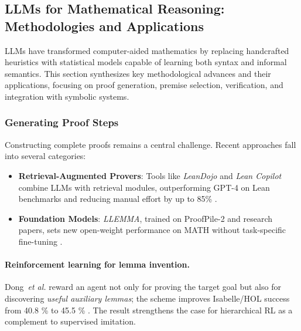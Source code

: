 \documentclass[acmsmall,anonymous]{acmart}
\begin{document}
\subsection{LLMs for Mathematical Reasoning: Methodologies and Applications}
LLMs have transformed computer-aided mathematics by replacing handcrafted heuristics with statistical models capable of learning both syntax and informal semantics. This section synthesizes key methodological advances and their applications, focusing on proof generation, premise selection, verification, and integration with symbolic systems. 

\subsubsection{Generating Proof Steps}\label{sec:proof-steps}
Constructing complete proofs remains a central challenge. Recent approaches fall into several categories:   
\begin{itemize}
    \item \textbf{Retrieval-Augmented Provers}: Tools like \emph{LeanDojo} and \emph{Lean Copilot} combine LLMs with retrieval modules, outperforming GPT-4 on Lean benchmarks and reducing manual effort by up to 85\% \cite{yang-2023-leandojo, huang2024leancopilot}.
    \item \textbf{Foundation Models}: \emph{LLEMMA}, trained on ProofPile-2 and research papers, sets new open-weight performance on MATH without task-specific fine-tuning \cite{azerbayev2024llemma}.
\end{itemize}

\paragraph{Reinforcement learning for lemma invention.}
Dong~\emph{et al.} reward an agent not only for proving the target
goal but also for discovering \emph{useful auxiliary lemmas}; the scheme
improves Isabelle/HOL success from 40.8 \% to 45.5 \%
\cite{dong2024lemmaRL}. The result strengthens the case for hierarchical
RL as a complement to supervised imitation.
\end{document}

